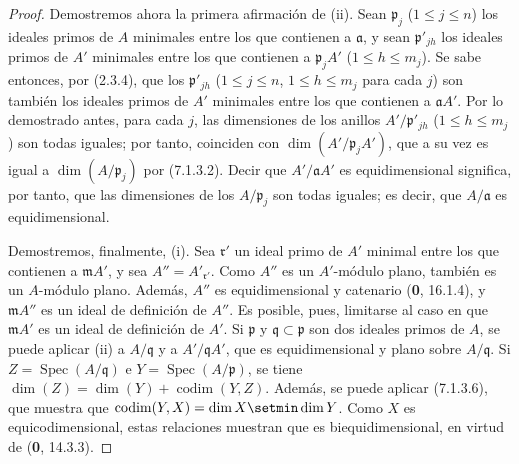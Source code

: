 \begin{proof}
Demostremos ahora la primera afirmación de (ii). Sean
$\mathfrak p_j$ ($1\leqslant j\leqslant n$) los ideales
primos de $A$ minimales entre los que contienen a
$\mathfrak a$, y sean $\mathfrak p'_{jh}$ los ideales
primos de $A'$ minimales entre los que contienen a
$\mathfrak p_jA'$ ($1\leqslant h\leqslant m_j$).
Se sabe entonces, por (2.3.4), que los
$\mathfrak p'_{jh}$ ($1\leqslant j\leqslant n$,
$1\leqslant h\leqslant
m_j$ para cada $j$) son también
los ideales primos de $A'$ minimales entre los que
contienen a $\mathfrak aA'$. Por lo demostrado antes,
para cada $j$, las dimensiones de los anillos
$A'/\mathfrak p'_{jh}$ ($1\leqslant h\leqslant m_j$)
son todas iguales; por tanto, coinciden con
$\dim(A'/\mathfrak p_jA')$, que a su vez es igual a
$\dim(A/\mathfrak p_j)$ por (7.1.3.2). Decir que
$A'/\mathfrak aA'$ es equidimensional significa,
por tanto, que las dimensiones de los $A/\mathfrak p_j$
son todas iguales; es decir, que $A/\mathfrak a$ es
equidimensional.

Demostremos, finalmente, (i). Sea $\mathfrak r'$ un
ideal primo de $A'$ minimal entre los que contienen a
$\mathfrak mA'$, y sea $A''=A'_{\mathfrak r'}$.
Como $A''$ es un $A'$-módulo plano, también es un
$A$-módulo plano. Además, $A''$ es equidimensional y
catenario (\textbf{0}, 16.1.4), y $\mathfrak mA''$ es un ideal
de definición de $A''$. Es posible, pues, limitarse
al caso en que $\mathfrak mA'$ es un ideal de definición
de $A'$. Si $\mathfrak p$ y $\mathfrak q\subset\mathfrak p$
son dos ideales primos de $A$, se puede aplicar (ii)
a $A/\mathfrak q$ y a $A'/\mathfrak qA'$, que es
equidimensional y plano sobre $A/\mathfrak q$.
Si $Z=\operatorname{Spec}(A/\mathfrak q)$ e
$Y=\operatorname{Spec}(A/\mathfrak p)$, se tiene
$\dim(Z)=\dim(Y)+\operatorname{codim}(Y,Z)$.
Además, se puede aplicar (7.1.3.6), que muestra que
$\operatorname{codim}(Y,X)=\dim X\setmin\dim Y$.
Como $X$ es equicodimensional, estas relaciones
muestran que es biequidimensional, en virtud de
(\textbf 0, 14.3.3).
\end{proof}

